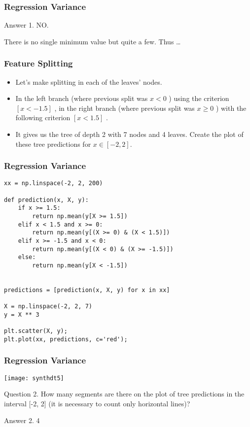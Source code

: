 \begin{frame}[fragile]\frametitle{Regression Variance}	
Answer 1. NO.

There is no single minimum value but quite a few. Thus \ldots
\end{frame}

\begin{frame}[fragile]\frametitle{Feature Splitting}	
\begin{itemize}
\item Let's make splitting in each of the leaves' nodes. 
\item In the left branch (where previous split was $x<0$ ) using the criterion  $[x < -1.5]$ , in the right branch (where previous split was  $x \geqslant 0$ ) with the following criterion  $[x < 1.5]$ . 
\item It gives us the tree of depth 2 with 7 nodes and 4 leaves. Create the plot of these tree predictions for $x \in [-2, 2]$.
\end{itemize}
\end{frame}

\begin{frame}[fragile]\frametitle{Regression Variance}	
\begin{lstlisting}
xx = np.linspace(-2, 2, 200)

def prediction(x, X, y):
    if x >= 1.5:
        return np.mean(y[X >= 1.5])
    elif x < 1.5 and x >= 0:
        return np.mean(y[(X >= 0) & (X < 1.5)])
    elif x >= -1.5 and x < 0:
        return np.mean(y[(X < 0) & (X >= -1.5)])
    else:
        return np.mean(y[X < -1.5])
    
    
predictions = [prediction(x, X, y) for x in xx]

X = np.linspace(-2, 2, 7)
y = X ** 3

plt.scatter(X, y);
plt.plot(xx, predictions, c='red');

\end{lstlisting}

\end{frame}

\begin{frame}[fragile]\frametitle{Regression Variance}	
\begin{center}
\texttt{[image: synthdt5]}
\end{center}

Question 2. How many segments are there on the plot of tree predictions in the interval [-2, 2] (it is necessary to count only horizontal lines)?

Answer 2. 4

\end{frame}

